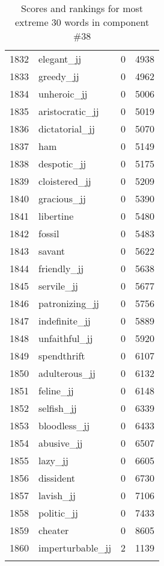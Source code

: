 \begin{longtable}[!htbp]{| rlr@{.}l |}
    1832 & elegant\_jj & 0 & 4938 \\
    1833 & greedy\_jj & 0 & 4962 \\
    1834 & unheroic\_jj & 0 & 5006 \\
    1835 & aristocratic\_jj & 0 & 5019 \\
    1836 & dictatorial\_jj & 0 & 5070 \\
    1837 & ham & 0 & 5149 \\
    1838 & despotic\_jj & 0 & 5175 \\
    1839 & cloistered\_jj & 0 & 5209 \\
    1840 & gracious\_jj & 0 & 5390 \\
    1841 & libertine & 0 & 5480 \\
    1842 & fossil & 0 & 5483 \\
    1843 & savant & 0 & 5622 \\
    1844 & friendly\_jj & 0 & 5638 \\
    1845 & servile\_jj & 0 & 5677 \\
    1846 & patronizing\_jj & 0 & 5756 \\
    1847 & indefinite\_jj & 0 & 5889 \\
    1848 & unfaithful\_jj & 0 & 5920 \\
    1849 & spendthrift & 0 & 6107 \\
    1850 & adulterous\_jj & 0 & 6132 \\
    1851 & feline\_jj & 0 & 6148 \\
    1852 & selfish\_jj & 0 & 6339 \\
    1853 & bloodless\_jj & 0 & 6433 \\
    1854 & abusive\_jj & 0 & 6507 \\
    1855 & lazy\_jj & 0 & 6605 \\
    1856 & dissident & 0 & 6730 \\
    1857 & lavish\_jj & 0 & 7106 \\
    1858 & politic\_jj & 0 & 7433 \\
    1859 & cheater & 0 & 8605 \\
    1860 & imperturbable\_jj & 2 & 1139 \\
    \hline
    \caption{Scores and rankings for most extreme 30 words in component \#38} \\
\end{longtable}
